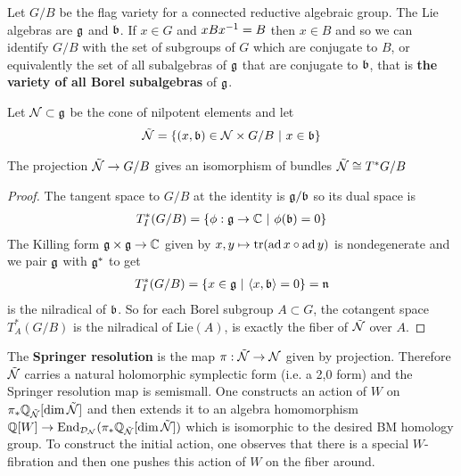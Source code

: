 \documentclass[12pt]{article}
\begin{document}
\hfill

Let $G/B$ be the flag variety for a connected reductive algebraic group. 
The Lie algebras are $\mathfrak{g}$ and $\mathfrak{b}$. If $x\in G$ and $xB{x}^{-1} = B$ 
then $x\in B$ and so we can identify $G/B$ with the set of subgroups of $G$
which are conjugate to $B$, or equivalently the set of all subalgebras of $\mathfrak{g}$
that are conjugate to $\mathfrak{b}$, that is \textbf{the variety of all Borel subalgebras} of $\mathfrak{g}$.

\hfill

Let ${\mathcal{N}}\subset \mathfrak{g}$ be 
the cone of nilpotent elements and let \begin{align*}
    \tilde {{\mathcal{N}}} = \{(x,\mathfrak{b})\in {\mathcal{N}}\times G/B \ \vert \  x\in \mathfrak{b}\}
\end{align*}

\begin{lemma}
    The projection $\tilde {{\mathcal{N}}} \to G/B$ gives an isomorphism of bundles $\tilde {{\mathcal{N}}} \cong T^*G/B$
\end{lemma}

\begin{proof}
    The tangent space to $G/B$ at the identity is $\mathfrak{g}/\mathfrak{b}$ so its dual space is \begin{align*}
        T^*_I(G/B) = \{\phi:\mathfrak{g} \to \mathbb{C} \ \vert \  \phi(\mathfrak{b}) = 0\}
    \end{align*} The Killing form $\mathfrak{g} \times \mathfrak{g} \to \mathbb{C}$ given by
    $x,y\mapsto \operatorname{tr}(\operatorname{ad} x \circ \operatorname{ad} y)$ is nondegenerate and we pair $\mathfrak{g}$ with $\mathfrak{g}^*$ 
    to get \begin{align*}
        T^*_I(G/B) = \{x\in \mathfrak{g} \ \vert \  \langle x,\mathfrak{b}\rangle = 0\} = \mathfrak{n}
    \end{align*} is the nilradical of $\mathfrak{b}$. So for each Borel subgroup $A\subset G$, 
    the cotangent space $T^*_{A}(G/B)$ is the nilradical of $\text{Lie}(A)$, is exactly 
    the fiber of $\tilde {{\mathcal{N}}}$ over $A$.
\end{proof}

The \textbf{Springer resolution} is the map $\pi:\tilde {{\mathcal{N}}} \to {\mathcal{N}}$
 given by projection.
Therefore $\tilde {{\mathcal{N}}}$ carries a natural holomorphic symplectic form (i.e. a 2,0 form)
and the Springer resolution map is semismall. One constructs an action of $W$ on 
$\pi_*\mathbb{Q}_{\tilde {{\mathcal{N}}}}[\dim \tilde {{\mathcal{N}}}]$ and then extends it to an algebra homomorphism 
$\mathbb{Q}[W] \to \operatorname{End}_{{\mathcal{D}}_{{\mathcal{N}}}}(\pi_*\mathbb{Q}_{\tilde {{\mathcal{N}}}}[\dim \tilde {{\mathcal{N}}}])$
which is isomorphic to the desired BM homology group. To construct the initial action,
one observes that there is a special $W$-fibration and then one pushes this action 
of $W$ on the fiber around. 
\end{document}
